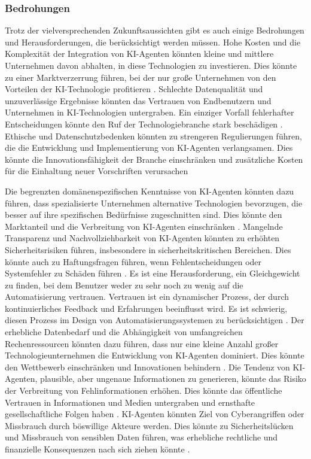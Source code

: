 \documentclass[conference]{IEEEtran}
\begin{document}
\subsubsection{Bedrohungen}
Trotz der vielversprechenden Zukunftsaussichten gibt es auch einige Bedrohungen und Herausforderungen, die berücksichtigt werden müssen. Hohe Kosten und die Komplexität der Integration von KI-Agenten könnten kleine und mittlere Unternehmen davon abhalten, in diese Technologien zu investieren. Dies könnte zu einer Marktverzerrung führen, bei der nur große Unternehmen von den Vorteilen der KI-Technologie profitieren  \cite{noauthor_was_nodate}. 
Schlechte Datenqualität und unzuverlässige Ergebnisse könnten das Vertrauen von Endbenutzern und Unternehmen in KI-Technologien untergraben. Ein einziger Vorfall fehlerhafter Entscheidungen könnte den Ruf der Technologiebranche stark beschädigen  \cite{gao_artificial_2022}. Ethische und Datenschutzbedenken könnten zu strengeren Regulierungen führen, die die Entwicklung und Implementierung von KI-Agenten verlangsamen. Dies könnte die Innovationsfähigkeit der Branche einschränken und zusätzliche Kosten für die Einhaltung neuer Vorschriften verursachen  \cite{v-hanki_was_2023}

Die begrenzten domänenspezifischen Kenntnisse von KI-Agenten könnten dazu führen, dass spezialisierte Unternehmen alternative Technologien bevorzugen, die besser auf ihre spezifischen Bedürfnisse zugeschnitten sind. Dies könnte den Marktanteil und die Verbreitung von KI-Agenten einschränken  \cite{dagher_evolution_2023}. Mangelnde Transparenz und Nachvollziehbarkeit von KI-Agenten könnten zu erhöhten Sicherheitsrisiken führen, insbesondere in sicherheitskritischen Bereichen. Dies könnte auch zu Haftungsfragen führen, wenn Fehlentscheidungen oder Systemfehler zu Schäden führen \cite{lappin_assessing_2024}.
Es ist eine Herausforderung, ein Gleichgewicht zu finden, bei dem Benutzer weder zu sehr noch zu wenig auf die Automatisierung vertrauen. Vertrauen ist ein dynamischer Prozess, der durch kontinuierliches Feedback und Erfahrungen beeinflusst wird. Es ist schwierig, diesen Prozess im Design von Automatisierungssystemen zu berücksichtigen \cite{noauthor_hyper-personalization_nodate}. Der erhebliche Datenbedarf und die Abhängigkeit von umfangreichen Rechenressourcen könnten dazu führen, dass nur eine kleine Anzahl großer Technologieunternehmen die Entwicklung von KI-Agenten dominiert. Dies könnte den Wettbewerb einschränken und Innovationen behindern \cite{lappin_assessing_2024}. 
Die Tendenz von KI-Agenten, plausible, aber ungenaue Informationen zu generieren, könnte das Risiko der Verbreitung von Fehlinformationen erhöhen. Dies könnte das öffentliche Vertrauen in Informationen und Medien untergraben und ernsthafte gesellschaftliche Folgen haben \cite{lappin_assessing_2024}. KI-Agenten könnten Ziel von Cyberangriffen oder Missbrauch durch böswillige Akteure werden. Dies könnte zu Sicherheitslücken und Missbrauch von sensiblen Daten führen, was erhebliche rechtliche und finanzielle Konsequenzen nach sich ziehen könnte  \cite{lappin_assessing_2024}.
\end{document}
